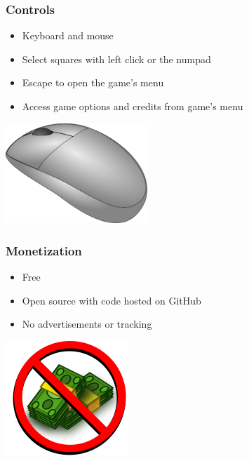 \documentclass{beamer}
\begin{document}
\begin{frame}
  \frametitle{Controls}

  \begin{itemize}
    \item Keyboard and mouse
    \item Select squares with left click or the numpad
    \item Escape to open the game's menu
    \item Access game options and credits from game's menu
  \end{itemize}

  \begin{center}
    \vspace{1em}
    \includegraphics[width=0.4\textwidth]{img/clip-art/computer-mouse}
  \end{center}

\end{frame}


\begin{frame}
  \frametitle{Monetization}

  \begin{itemize}
    \item Free
    \item Open source with code hosted on GitHub
    \item No advertisements or tracking
  \end{itemize}

  \begin{center}
    \vspace{1em}
    \includegraphics[height=0.40\textheight]{img/clip-art/no-money}
  \end{center}

\end{frame}
\end{document}

